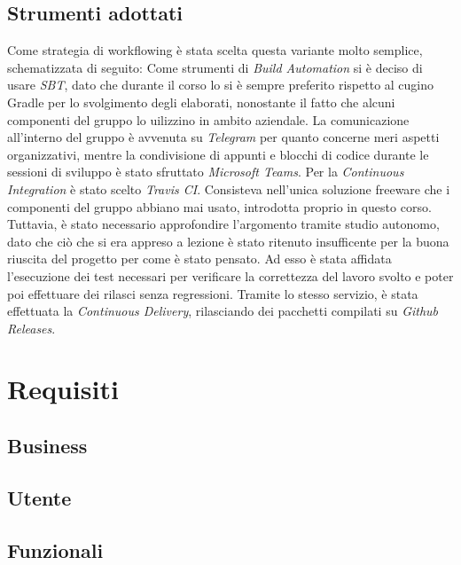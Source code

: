 \documentclass{article}
\begin{document}
    \subsection{Strumenti adottati}
    Come strategia di workflowing è stata scelta questa variante molto semplice, schematizzata di seguito:
    Come strumenti di \textit{Build Automation} si è deciso di usare \textit{SBT}, dato che durante il corso lo si è
    sempre preferito rispetto al cugino Gradle per lo svolgimento degli elaborati, nonostante il fatto che alcuni
    componenti del gruppo lo uilizzino in ambito aziendale.
    La comunicazione all'interno del gruppo è avvenuta su \textit{Telegram} per quanto concerne meri aspetti
    organizzativi, mentre la condivisione di appunti e blocchi di codice durante le sessioni di sviluppo è stato
    sfruttato \textit{Microsoft Teams}.
    Per la \textit{Continuous Integration} è stato scelto \textit{Travis CI}. Consisteva nell'unica soluzione freeware
    che i componenti del gruppo abbiano mai usato, introdotta proprio in questo corso. Tuttavia, è stato necessario
    approfondire l'argomento tramite studio autonomo, dato che ciò che si era appreso a lezione è stato ritenuto
    insufficente per la buona riuscita del progetto per come è stato pensato. Ad esso è stata affidata l'esecuzione dei
    test necessari per verificare la correttezza del lavoro svolto e poter poi effettuare dei rilasci senza regressioni.
    Tramite lo stesso servizio, è stata effettuata la \textit{Continuous Delivery}, rilasciando dei pacchetti compilati
    su \textit{Github Releases}.

    \newpage


    \section{Requisiti}

    \subsection{Business}

    \subsection{Utente}

    \subsection{Funzionali}
\end{document}
